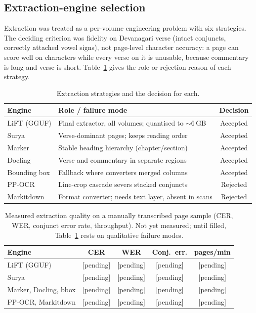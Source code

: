 \documentclass[10pt,twocolumn,letterpaper]{article}
\begin{document}
\subsection{Extraction-engine selection}

Extraction was treated as a per-volume engineering problem with six strategies.
The deciding criterion was fidelity on Devanagari verse (intact conjuncts,
correctly attached vowel signs), not page-level character accuracy: a page can
score well on characters while every verse on it is unusable, because commentary
is long and verse is short. Table~\ref{tab:ocr-decision} gives the role or rejection
reason of each strategy.

\begin{table}[t]
\centering
\small
\setlength{\tabcolsep}{4pt}
\begin{tabular}{@{}llc@{}}
\toprule
\textbf{Engine} & \textbf{Role / failure mode} & \textbf{Decision} \\
\midrule
LiFT (GGUF)   & Final extractor, all volumes; quantised to $\sim$6\,GB & Accepted \\
Surya~\cite{surya}   & Verse-dominant pages; keeps reading order & Accepted \\
Marker~\cite{marker} & Stable heading hierarchy (chapter/section) & Accepted \\
Docling~\cite{docling} & Verse and commentary in separate regions & Accepted \\
Bounding box  & Fallback where converters merged columns & Accepted \\
PP-OCR~\cite{ppocr}  & Line-crop cascade severs stacked conjuncts & Rejected \\
Markitdown    & Format converter; needs text layer, absent in scans & Rejected \\
\bottomrule
\end{tabular}
\caption{Extraction strategies and the decision for each.}
\label{tab:ocr-decision}
\end{table}

\begin{table}[t]
\centering
\small
\setlength{\tabcolsep}{3pt}
\begin{tabular}{@{}lcccc@{}}
\toprule
\textbf{Engine} & \textbf{CER} & \textbf{WER} & \textbf{Conj.\ err.} & \textbf{pages/min} \\
\midrule
LiFT (GGUF)   & [pending] & [pending] & [pending] & [pending] \\
Surya         & [pending] & [pending] & [pending] & [pending] \\
Marker, Docling, bbox & [pending] & [pending] & [pending] & [pending] \\
PP-OCR, Markitdown    & [pending] & [pending] & [pending] & [pending] \\
\bottomrule
\end{tabular}
\caption{Measured extraction quality on a manually transcribed page sample (CER, WER,
conjunct error rate, throughput). Not yet measured; until filled,
Table~\ref{tab:ocr-decision} rests on qualitative failure modes.}
\label{tab:ocr-pending}
\end{table}
\end{document}
